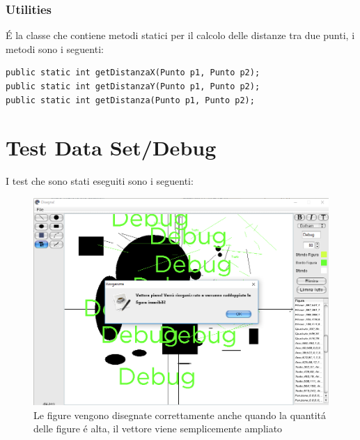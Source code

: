 \documentclass[a4paper,12pt,times,numbered,print,index]{article}
\begin{document}
\subsubsection{Utilities}
É la classe che contiene metodi statici per il calcolo delle distanze tra due punti, i metodi sono i seguenti:
\begin{lstlisting}
public static int getDistanzaX(Punto p1, Punto p2);
public static int getDistanzaY(Punto p1, Punto p2);
public static int getDistanza(Punto p1, Punto p2);
\end{lstlisting}

\section{Test Data Set/Debug}
I test che sono stati eseguiti sono i seguenti:
\listoffigures

\begin{figure}[1]
  \includegraphics[scale=.5]{Immagini/Debug/test1.png}
  \caption[Disegno delle figure]{Le figure vengono disegnate correttamente anche quando la quantitá delle figure é alta, il vettore viene semplicemente ampliato}
\end{figure}
\end{document}
